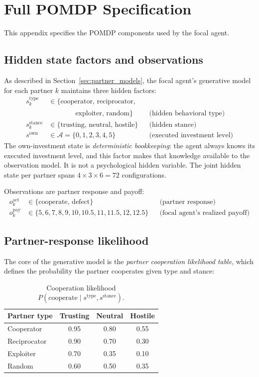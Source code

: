 \section{Full POMDP Specification}
\label{app:pomdp}

This appendix specifies the POMDP components used by the focal agent.

\subsection{Hidden state factors and observations}

As described in Section~\ref{sec:partner_models}, the focal agent's generative model for each partner $k$ maintains three hidden factors:
\begin{align}
s_k^{\text{type}} &\in \{\text{cooperator, reciprocator,} \nonumber\\
  &\phantom{s_k^{\text{type}} \in \{}\;\text{exploiter, random}\} && \text{(hidden behavioral type)} \label{eq:s_type}\\
s_k^{\text{stance}} &\in \{\text{trusting, neutral, hostile}\} && \text{(hidden stance)} \label{eq:s_stance}\\
s^{\mathrm{own}} &\in \mathcal{A}=\{0,1,2,3,4,5\} && \text{(executed investment level)}
\end{align}
The own-investment state is \emph{deterministic bookkeeping}: the agent always knows its executed investment level, and this factor makes that knowledge available to the observation model. It is not a psychological hidden variable. The joint hidden state per partner spans \(4 \times 3 \times 6 = 72\) configurations.

Observations are partner response and payoff:
\begin{align}
o_k^{\text{act}} &\in \{\text{cooperate, defect}\} & &\text{(partner response)}\\
o_k^{\text{pay}} &\in \{5,6,7,8,9,10,10.5,11,11.5,12,12.5\} & &\text{(focal agent's realized payoff)}
\end{align}

\subsection{Partner-response likelihood}

The core of the generative model is the \emph{partner cooperation likelihood table}, which defines the probability the partner cooperates given type and stance:
\begin{table}[H]
\centering
\caption{Cooperation likelihood $P(\text{cooperate} \mid s^{\text{type}}, s^{\text{stance}})$.}
\label{tab:coop_likelihood}
\begin{tabular}{lccc}
\toprule
Partner type & Trusting & Neutral & Hostile \\
\midrule
Cooperator & 0.95 & 0.80 & 0.55 \\
Reciprocator & 0.90 & 0.70 & 0.30 \\
Exploiter & 0.70 & 0.35 & 0.10 \\
Random & 0.60 & 0.50 & 0.35 \\
\bottomrule
\end{tabular}
\end{table}

